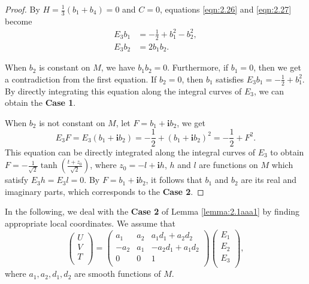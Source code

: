 \documentclass[reqno]{amsart}%
\theoremstyle{definition}
\numberwithin{equation}{section}
\begin{document}
\begin{proof}
By $H=\frac{1}{3}(b_1+b_4)=0$ and $C=0$, equations \eqref{eqn:2.26} and \eqref{eqn:2.27} become
\begin{equation*}
\begin{split}
E_3b_1&=-\tfrac{1}{2}+b_1^2-b_2^2,\\
E_3b_2&=2b_1b_2.
\end{split}	
\end{equation*}


When $b_2$ is constant on $M$, we have $b_1b_2=0$. Furthermore,
if $b_1=0$, then we get a contradiction from the first equation.
If $b_2=0$, then $b_1$ satisfies $E_3b_1=-\tfrac{1}{2}+b_1^2$. By directly integrating
this equation along the integral curves of $E_3$, we can obtain the {\bf Case 1}.

When $b_2$ is not constant on $M$, let $F=b_1+\mathbf{i}b_2$, we get
$$
E_3F=E_3(b_1+\mathbf{i}b_2)=-\frac{1}{2}+(b_1+\mathbf{i}b_2)^2=-\frac{1}{2}+F^2.
$$
This equation can be directly integrated along the integral curves of $E_3$
to obtain $F=-\frac{1}{\sqrt{2}}\tanh(\frac{t+z_0}{\sqrt{2}})$,
where $z_0=-l+\mathbf{i}h$, $h$ and $l$ are functions on $M$ which satisfy $E_3h=E_3l=0$.
By $F=b_1+\mathbf{i}b_2$, it follows that $b_1$ and $b_2$ are its real and imaginary parts,
which corresponds to the {\bf Case 2}.
\end{proof}



In the following, we deal with the {\bf Case 2} of Lemma \ref{lemma:2.1aaa1} 
by finding appropriate local coordinates. 
We assume that
\begin{equation}\label{UVT-H2}
\left(
  \begin{array}{c}
    U \\
    V \\
    T \\
  \end{array}
\right)
=
\left(
  \begin{array}{ccc}
    a_1 & a_2 & a_1d_1+a_2d_2 \\
    -a_2 & a_1 & -a_2d_1+a_1d_2 \\
    0 & 0 & 1 \\
  \end{array}
\right)
\left(
  \begin{array}{c}
    E_1 \\
    E_2 \\
    E_3 \\
  \end{array}
\right),
\end{equation}
where $a_1,a_2,d_1,d_2$ are smooth functions of $M$.
\end{document}
